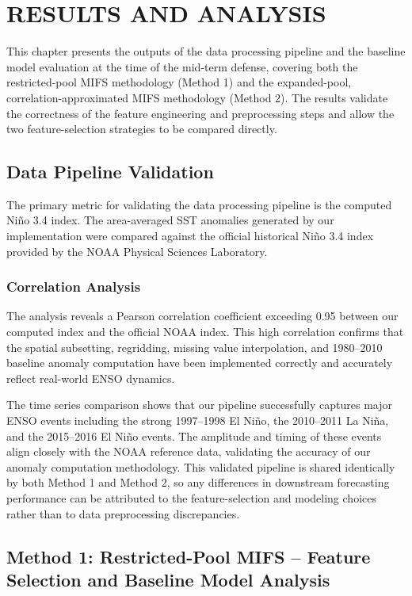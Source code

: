 \chapter{RESULTS AND ANALYSIS}
\label{chap:results}
This chapter presents the outputs of the data processing pipeline and the baseline model evaluation at the time of the mid-term defense, covering both the restricted-pool MIFS methodology (Method 1) and the expanded-pool, correlation-approximated MIFS methodology (Method 2). The results validate the correctness of the feature engineering and preprocessing steps and allow the two feature-selection strategies to be compared directly.

\section{Data Pipeline Validation}

The primary metric for validating the data processing pipeline is the computed Ni\~{n}o 3.4 index. The area-averaged SST anomalies generated by our implementation were compared against the official historical Ni\~{n}o 3.4 index provided by the NOAA Physical Sciences Laboratory.

\subsection{Correlation Analysis}

The analysis reveals a Pearson correlation coefficient exceeding 0.95 between our computed index and the official NOAA index. This high correlation confirms that the spatial subsetting, regridding, missing value interpolation, and 1980--2010 baseline anomaly computation have been implemented correctly and accurately reflect real-world ENSO dynamics.

The time series comparison shows that our pipeline successfully captures major ENSO events including the strong 1997--1998 El Ni\~{n}o, the 2010--2011 La Ni\~{n}a, and the 2015--2016 El Ni\~{n}o events. The amplitude and timing of these events align closely with the NOAA reference data, validating the accuracy of our anomaly computation methodology. This validated pipeline is shared identically by both Method 1 and Method 2, so any differences in downstream forecasting performance can be attributed to the feature-selection and modeling choices rather than to data preprocessing discrepancies.

\section{Method 1: Restricted-Pool MIFS -- Feature Selection and Baseline Model Analysis}

